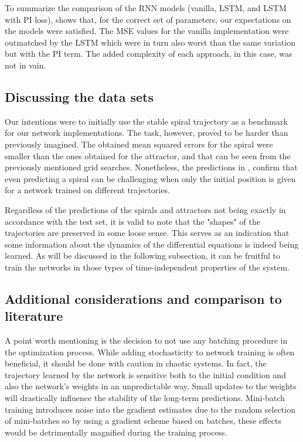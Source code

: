 To summarize the comparison of the RNN models (vanilla, LSTM, and LSTM with PI loss),  shows that, for the correct set of parameters, our expectations on the models were satisfied. The MSE values for the vanilla implementation were outmatched by the LSTM which were in turn also worst than the same variation but with the PI term. The added complexity of each approach, in this case, was not in vain.



\subsection{Discussing the data sets}

Our intentions were to initially use the stable spiral trajectory as a benchmark for our network implementations. The task, however, proved to be harder than previously imagined. The obtained mean squared errors for the spiral were smaller than the ones obtained for the attractor, and that can be seen from the previously mentioned grid searches. Nonetheless, the predictions in , confirm that even predicting a spiral can be challenging when only the initial position is given for a network trained on different trajectories.

Regardless of the predictions of the spirals and attractors not being exactly in accordance with the test set, it is valid to note that the "shapes" of the trajectories are preserved in some loose sense. This serves as an indication that some information about the dynamics of the differential equations is indeed being learned. As will be discussed in the following subsection, it can be fruitful to train the networks in those types of time-independent properties of the system.


\subsection{Additional considerations and comparison to literature}

A point worth mentioning is the decision to not use any batching procedure in the optimization process. While adding stochasticity to network training is often beneficial, it should be done with caution in chaotic systems. In fact, the trajectory learned by the network is sensitive both to the initial condition and also the network's weights in an unpredictable way. Small updates to the weights will drastically influence the stability of the long-term predictions. Mini-batch training introduces noise into the gradient estimates due to the random selection of mini-batches so by using a gradient scheme based on batches, these effects would be detrimentally magnified during the training process.

